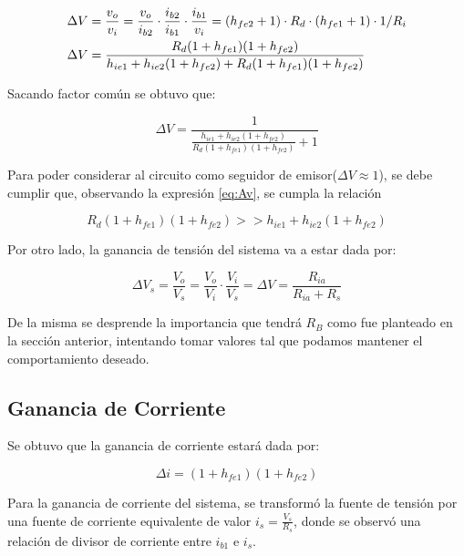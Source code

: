 \begin{align}
    \Delta V &= \frac{v_o}{v_i} = \frac{v_o}{i_{b2}}\cdot \frac{i_{b2}}{i_{b1}}\cdot \frac{i_{b1}}{v_i} = (h_{fe2}+1)\cdot R_d \cdot (h_{fe1}+1)\cdot 1/ R_i \\
    \vspace{2mm}
    \Delta V &= \frac{R_d(1+h_{fe1})(1+h_{fe2})}{h_{ie1} + h_{ie2}(1+h_{fe2}) + R_d(1+h_{fe1})(1+h_{fe2})}
\end{align}

Sacando factor común se obtuvo que:

\begin{equation}
    \Delta V = \frac{1}{\frac{h_{ie1} + h_{ie2}(1+h_{fe2})}{R_d(1+h_{fe1})(1+h_{fe2})} + 1 }
    \label{eq:Av}
\end{equation}

Para poder considerar al circuito como seguidor de emisor($\Delta V \approx 1$), se debe cumplir que, observando la expresión \eqref{eq:Av}, se cumpla la relación

\begin{equation}
    R_d(1+h_{fe1})(1+h_{fe2}) >> h_{ie1} + h_{ie2}(1+h_{fe2})
\end{equation}

Por otro lado, la ganancia de tensión del sistema va a estar dada por:

\begin{equation}
    \Delta V_s = \frac{V_o}{V_s} = \frac{V_o}{V_i} \cdot \frac{V_i}{V_s} = \Delta V= \frac{R_{ia}}{R_{ia}+R_s}
\end{equation}

De la misma se desprende la importancia que tendrá $R_B$ como fue planteado en la sección anterior, intentando tomar valores 
tal que podamos mantener el comportamiento deseado.


\subsection{Ganancia de Corriente}

Se obtuvo que la ganancia de corriente estará dada por:

\begin{equation}
    \Delta i = (1+h_{fe1})(1+h_{fe2})
\end{equation}


Para la ganancia de corriente del sistema, se transformó la fuente de tensión por una fuente de corriente equivalente de valor $i_s=\frac{V_s}{R_s}$, 
donde se observó una relación de divisor de corriente entre $i_{b1}$ e $i_s$. 

